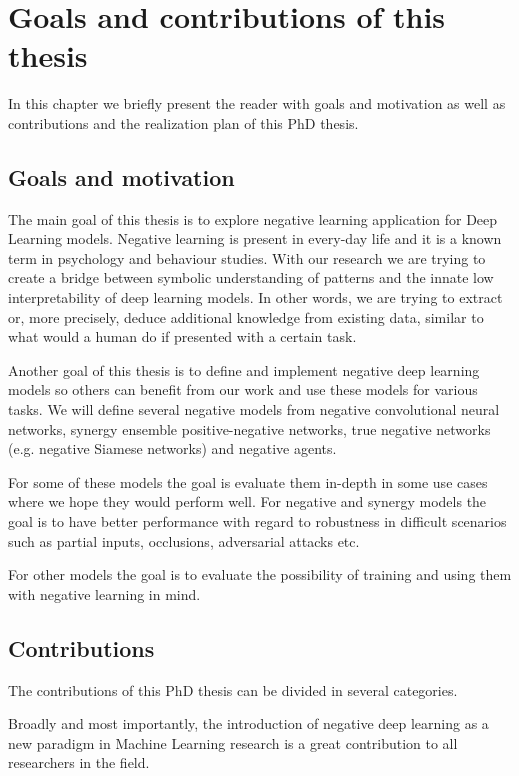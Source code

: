 \documentclass[b5paper]{book}
\begin{document}
\chapter{Goals and contributions of this thesis}

In this chapter we briefly present the reader with goals and motivation as well as contributions and the realization plan of this PhD thesis. 

\section{Goals and motivation}

The main goal of this thesis is to explore negative learning application for Deep Learning models. Negative learning is present in every-day life and it is a known term in psychology and behaviour studies. With our research we are trying to create a bridge between symbolic understanding of patterns and the innate low interpretability of deep learning models. In other words, we are trying to extract or, more precisely, deduce additional knowledge from existing data, similar to what would a human do if presented with a certain task.

Another goal of this thesis is to define and implement negative deep learning models so others can benefit from our work and use these models for various tasks. We will define several negative models from negative convolutional neural networks, synergy ensemble positive-negative networks, true negative networks (e.g. negative Siamese networks) and negative agents.

For some of these models the goal is evaluate them in-depth in some use cases where we hope they would perform well. For negative and synergy models the goal is to have better performance with regard to robustness in difficult scenarios such as partial inputs, occlusions, adversarial attacks etc. 

For other models the goal is to evaluate the possibility of training and using them with negative learning in mind.

\section{Contributions}

The contributions of this PhD thesis can be divided in several categories.

Broadly and most importantly, the introduction of negative deep learning as a new paradigm in Machine Learning research is a great contribution to all researchers in the field. 
\end{document}
